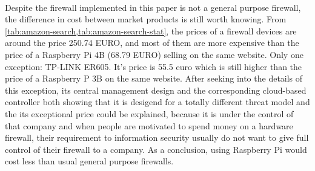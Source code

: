\documentclass[mscthesis]{usiinfthesis}
\begin{document}
\paragraph{}
Despite the firewall implemented in this paper is not a general purpose firewall, the difference in cost between market products is still worth knowing. From \cref{tab:amazon-search,tab:amazon-search-stat}, the prices of a firewall devices are around the price 250.74 EURO, and most of them are more expensive than the price of a Raspberry Pi 4B (68.79 EURO) selling on the same website. Only one exception: TP-LINK ER605. It's price is 55.5 euro which is still higher than the price of a Raspberry P 3B on the same website. After seeking into the details of this exception, its central management design and the corresponding cloud-based controller both showing that it is desigend for a totally different threat model and the its exceptional price could be explained, because it is under the control of that company and when people are motivated to spend money on a hardware firewall, their requirement to information security usually do not want to give full control of their firewall to a company. As a conclusion, using Raspberry Pi would cost less than usual general purpose firewalls.
\end{document}
